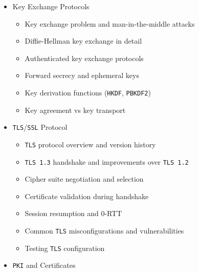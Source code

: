 \documentclass[
]{article}
\providecommand{\tightlist}{%
  \setlength{\itemsep}{0pt}\setlength{\parskip}{0pt}}
\begin{document}
\begin{itemize}
  \begin{itemize}
  \tightlist
  \item
    Digital signature concepts and use cases
  \item
    \texttt{RSA} signatures (\texttt{PKCS\#1\ v1.5}, PSS)
  \item
    \texttt{ECDSA} (Elliptic Curve Digital Signature Algorithm)
  \item
    EdDSA and Ed25519 signatures
  \item
    Signature verification and trust models
  \item
    Code signing and document signing applications
  \end{itemize}
\item
  Key Exchange Protocols

  \begin{itemize}
  \tightlist
  \item
    Key exchange problem and man-in-the-middle attacks
  \item
    Diffie-Hellman key exchange in detail
  \item
    Authenticated key exchange protocols
  \item
    Forward secrecy and ephemeral keys
  \item
    Key derivation functions (\texttt{HKDF}, \texttt{PBKDF2})
  \item
    Key agreement vs key transport
  \end{itemize}
\item
  \texttt{TLS}/\texttt{SSL} Protocol

  \begin{itemize}
  \tightlist
  \item
    \texttt{TLS} protocol overview and version history
  \item
    \texttt{TLS\ 1.3} handshake and improvements over \texttt{TLS\ 1.2}
  \item
    Cipher suite negotiation and selection
  \item
    Certificate validation during handshake
  \item
    Session resumption and 0-RTT
  \item
    Common \texttt{TLS} misconfigurations and vulnerabilities
  \item
    Testing \texttt{TLS} configuration
  \end{itemize}
\item
  \texttt{PKI} and Certificates


\end{itemize}
\end{document}
